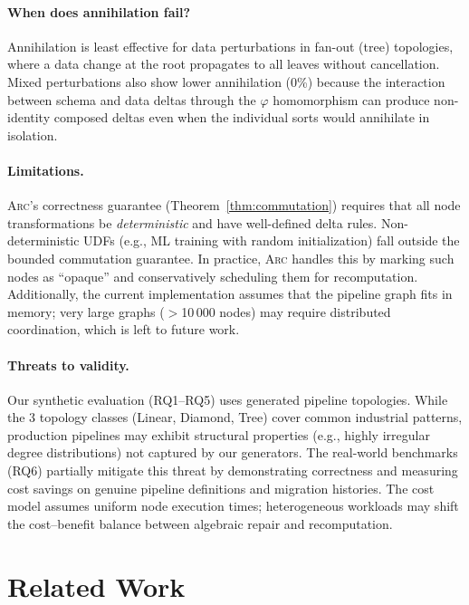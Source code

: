 \documentclass[sigplan,screen,nonacm]{acmart}
\newcommand{\arc}{\textsc{Arc}\xspace}
\begin{document}
\paragraph{When does annihilation fail?}
Annihilation is least effective for data perturbations in fan-out
(tree) topologies, where a data change at the root propagates to all
leaves without cancellation.  Mixed perturbations also
show lower annihilation (0\%) because the interaction between schema
and data deltas through the $\varphi$ homomorphism can produce non-identity
composed deltas even when the individual sorts would annihilate in
isolation.

\paragraph{Limitations.}
\arc's correctness guarantee (Theorem~\ref{thm:commutation}) requires
that all node transformations be \emph{deterministic} and have
well-defined delta rules.  Non-deterministic UDFs (e.g., ML training with
random initialization) fall outside the bounded commutation guarantee.
In practice, \arc handles this by marking such nodes as
``opaque'' and conservatively scheduling them for recomputation.
Additionally, the current implementation assumes that the pipeline graph
fits in memory; very large graphs ($>$10\,000 nodes) may require
distributed coordination, which is left to future work.

\paragraph{Threats to validity.}
Our synthetic evaluation (RQ1--RQ5) uses generated pipeline topologies.  While
the 3 topology classes (Linear, Diamond, Tree) cover common industrial patterns, production
pipelines may exhibit structural properties (e.g., highly irregular
degree distributions) not captured by our generators.  The real-world
benchmarks (RQ6) partially mitigate this threat by demonstrating
correctness and measuring cost savings on genuine pipeline definitions
and migration histories.  The cost model
assumes uniform node execution times; heterogeneous workloads may shift
the cost--benefit balance between algebraic repair and recomputation.

\section{Related Work}\label{sec:related}
\end{document}
